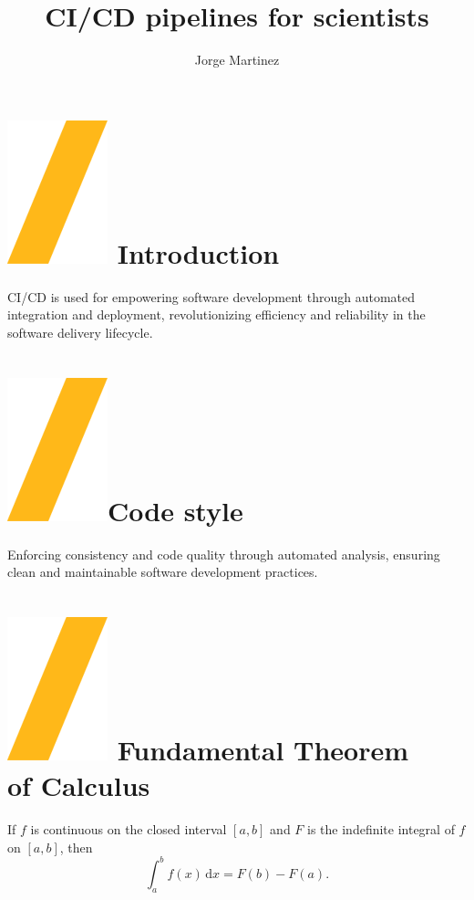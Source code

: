 \documentclass[a0paper,fleqn]{src/betterposter}
\begin{document}
{\title{CI\slash CD pipelines for scientists}
\author{Jorge Martinez}

\section{\includegraphics[height=\fontcharht\font`\S]{img/example/slash.png} Introduction}
CI/CD is used for empowering software development through automated integration
and deployment, revolutionizing efficiency and reliability in the software
delivery lifecycle.


\section{\includegraphics[height=\fontcharht\font`\S]{img/example/slash.png}Code style}
Enforcing consistency and code quality through automated analysis, ensuring clean and maintainable software development practices.

\section{\includegraphics[height=\fontcharht\font`\S]{img/example/slash.png} Fundamental Theorem\\of Calculus}
If $f$ is continuous on the closed interval $[a,b]$ and $F$ is the indefinite integral of $f$ on $[a,b]$, then
\begin{equation}
\int_a^b f(x)\,\mathrm{d}x = F(b)-F(a).
\end{equation}

}
\end{document}
